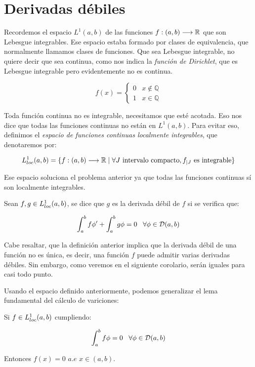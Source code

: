 \section{Derivadas débiles}

Recordemos el espacio $L^1(a,b)$ de las funciones $f : (a,b) \longrightarrow \mathbb{R}$ que son Lebesgue integrables. Ese espacio estaba formado por clases de equivalencia, que normalmente llamamos clases de funciones. Que sea Lebesgue integrable, no quiere decir que sea continua, como nos indica la \textit{función de Dirichlet}, que es Lebesgue integrable pero evidentemente no es continua.

\[
f(x)=\left\{
\begin{array}{cc}
0 & x\notin\mathbb{Q} \\
1 & x\in\mathbb{Q}
\end{array}
\right. 
\]

Toda función continua no es integrable, necesitamos que esté acotada. Eso nos dice que todas las funciones continuas no están en $L^1(a,b)$. Para evitar eso, definimos el \textit{espacio de funciones continuas localmente integrables}, que denotaremos por:

\[
L^1_{loc}(a,b)=\{f : (a,b) \longrightarrow \mathbb{R} \;|\; \forall J \text{ intervalo compacto},f_{|J}\text{ es integrable}\}
\]

Ese espacio soluciona el problema anterior ya que todas las funciones continuas sí son localmente integrables.

\begin{definition}
Sean $f,g\in L^1_{loc}(a,b)$, se dice que $g$ es la derivada débil de $f$ si se verifica que:

\[
\displaystyle\int_{ a }^{ b } f\phi'+\displaystyle\int_{ a }^{ b } g\phi=0 \;\;\; \forall\phi\in\mathcal{D}(a,b)
\]
\end{definition}

Cabe resaltar, que la definición anterior implica que la derivada débil de una función no es única, es decir, una función $f$ puede admitir varias derivadas débiles. Sin embargo, como veremos en el siguiente corolario, serán iguales para casi todo punto.

Usando el espacio definido anteriormente, podemos generalizar el lema fundamental del cálculo de variciones:

\begin{lemma}
Si $f\in L^1_{loc}(a,b)$ cumpliendo:

\[
\displaystyle\int_{ a }^{ b } f\phi=0 \;\;\;\forall\phi\in\mathcal{D}(a,b)
\]

Entonces $f(x)=0$ $a.e$ $x\in(a,b)$.

\end{lemma}

